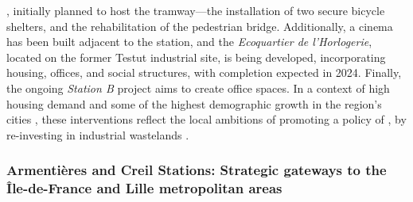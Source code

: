 \begin{refsegment}
{}, initially planned to host the tramway—the installation of two secure bicycle shelters, and the rehabilitation of the pedestrian bridge. Additionally, a cinema has been built adjacent to the station, and the \textsl{Ecoquartier de l'Horlogerie}, located on the former Testut industrial site, is being developed, incorporating housing, offices, and social structures, with completion expected in 2024. Finally, the ongoing \textsl{Station B} project aims to create office spaces. In a context of high housing demand and some of the highest demographic growth in the region's cities \textcolor{blue}{\autocite[32]{fnau_urbanisme_2008}}, these interventions reflect the local ambitions of promoting a policy of , by re-investing in industrial wastelands \textcolor{blue}{\autocite[38]{artois_mobilites_rapport_2024}}.

\subsubsection*{Armentières and Creil Stations: Strategic gateways to the Île-de-France and Lille metropolitan areas
    \label{chap3:application-observation-quantitative-armentieres-creil}
    }


\end{refsegment}
